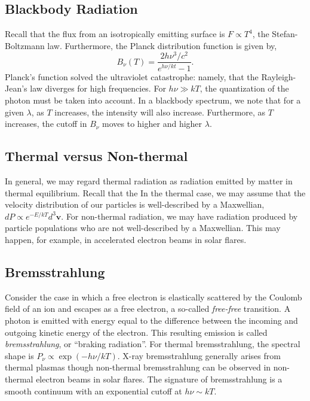 	\subsection{Blackbody Radiation}
	Recall that the flux from an isotropically emitting surface is $F\propto T^4$, the Stefan-Boltzmann law. Furthermore, the Planck distribution function is given by,
	\begin{equation}
		B_{\nu}(T) = \frac{2h\nu^3/c^2}{e^{h\nu/kt} - 1}.
	\end{equation}
	Planck's function solved the ultraviolet catastrophe: namely, that the Rayleigh-Jean's law diverges for high frequencies. For $h\nu\gg kT$, the quantization of the photon must be taken into account. In a blackbody spectrum, we note that for a given $\lambda$, as $T$ increases, the intensity will also increase. Furthermore, as $T$ increases, the cutoff in $B_{\nu}$ moves to higher and higher $\lambda$.
	
	\subsection{Thermal versus Non-thermal}
	In general, we may regard thermal radiation as radiation emitted by matter in thermal equilibrium. Recall that the In the thermal case, we may assume that the velocity distribution of our particles is well-described by a Maxwellian, $dP\propto e^{-E/kT}d^3\mathbf{v}$. For non-thermal radiation, we may have radiation produced by particle populations who are not well-described by a Maxwellian. This may happen, for example, in accelerated electron beams in solar flares. 
	
	\subsection{Bremsstrahlung}
	Consider the case in which a free electron is elastically scattered by the Coulomb field of an ion and escapes as a free electron, a so-called \textit{free-free} transition. A photon is emitted with energy equal to the difference between the incoming and outgoing kinetic energy of the electron. This resulting emission is called \textit{bremsstrahlung}, or ``braking radiation''. For thermal bremsstrahlung, the spectral shape is $P_{\nu}\propto\exp{(-h\nu/kT)}$. X-ray bremsstrahlung generally arises from thermal plasmas though non-thermal bremsstrahlung can be observed in non-thermal electron beams in solar flares. The signature of bremsstrahlung is a smooth continuum with an exponential cutoff at $h\nu\sim kT$.
	
